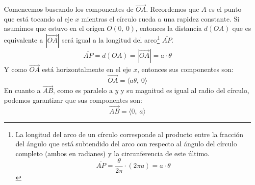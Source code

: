 \documentclass[12pt]{article}
\begin{document}
\begin{figure}[hbt!]
\centering


\end{figure}

Comencemos buscando los componentes de $\overrightarrow{OA}$. Recordemos que $A$ es el punto que está tocando al eje $x$ mientras el círculo rueda a una rapidez constante. Si asumimos que estuvo en el origen $O(0, \ 0)$, entonces la distancia $d(OA)$ que es equivalente a $|\overrightarrow{OA}|$ será igual a la longitud del arco\footnote{La longitud del arco de un círculo corresponde al producto entre la fracción del ángulo que está subtendido del arco con respecto al ángulo del círculo completo (ambos en radianes) y la circunferencia de este último.\[\overline{AP} = \frac{\theta}{2 \pi} \cdot (2 \pi a) = a \cdot \theta\]} $\overline{AP}$.
\[
  \overline{AP} = d(OA) = |\overrightarrow{OA}| = a \cdot \theta
\]
Y como $\overrightarrow{OA}$ está horizontalmente en el eje $x$, entonces sus componentes son:
\[
  \overrightarrow{OA} = \langle a \theta, \ 0 \rangle
\]
En cuanto a $\overrightarrow{AB}$, como es paralelo a $y$ y su magnitud es igual al radio del círculo, podemos garantizar que sus componentes son:
\[
  \overrightarrow{AB} = \langle 0, \ a \rangle
\]
\end{document}
